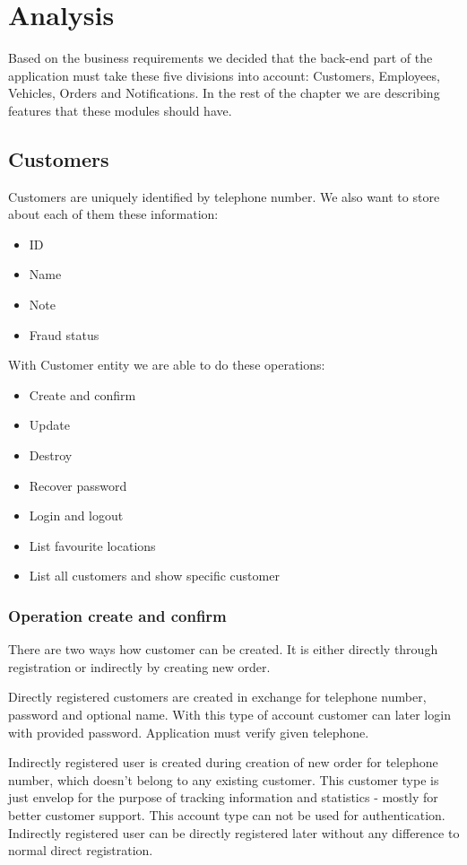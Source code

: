 \chapter{Analysis}
	Based on the business requirements we decided that the back-end part of the application must take these five divisions into account: Customers, Employees, Vehicles, Orders and Notifications. In the rest of the chapter we are describing features that these modules should have.
	
	\section{Customers}
		Customers are uniquely identified by telephone number. We also want to store about each of them these information:
		\begin{itemize}
			\item ID
			\item Name
			\item Note
			\item Fraud status
		\end{itemize}
	
		With Customer entity we are able to do these operations:
		\begin{itemize}
			\item Create and confirm
			\item Update
			\item Destroy
			\item Recover password
			\item Login and logout
			\item List favourite locations
			\item List all customers and show specific customer
		\end{itemize}
		\subsection{Operation create and confirm}
			There are two ways how customer can be created. It is either directly through registration or indirectly by creating new order.
			
			Directly registered customers are created in exchange for telephone number, password and optional name. With this type of account customer can later login with provided password. Application must verify given telephone.
			
			Indirectly registered user is created during creation of new order for telephone number, which doesn't belong to any existing customer. This customer type is just envelop for the purpose of tracking information and statistics - mostly for better customer support. This account type can not be used for authentication. Indirectly registered user can be directly registered later without any difference to normal direct registration.
		
